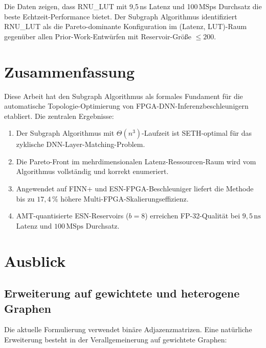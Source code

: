 ﻿\documentclass[a4paper,12pt]{article}
\theoremstyle{definition}
\begin{document}
Die Daten zeigen, dass RNU\_LUT mit 9,5\,ns Latenz und 100\,MSps Durchsatz die beste
Echtzeit-Performance bietet. Der Subgraph Algorithmus identifiziert RNU\_LUT als
die Pareto-dominante Konfiguration im (Latenz, LUT)-Raum gegenüber allen Prior-Work-Entwürfen
mit Reservoir-Größe $\leq 200$.

\section{Zusammenfassung}
\label{sec:zusammenfassung}

Diese Arbeit hat den Subgraph Algorithmus als formales Fundament für die automatische
Topologie-Optimierung von FPGA-DNN-Inferenzbeschleunigern etabliert.
Die zentralen Ergebnisse:

\begin{enumerate}
    \item Der Subgraph Algorithmus mit $\Theta(n^3)$-Laufzeit ist SETH-optimal für
          das zyklische DNN-Layer-Matching-Problem.
    \item Die Pareto-Front im mehrdimensionalen Latenz-Ressourcen-Raum wird vom
          Algorithmus vollständig und korrekt enumeriert.
    \item Angewendet auf FINN+ und ESN-FPGA-Beschleuniger liefert die Methode
          bis zu $17{,}4\,\%$ höhere Multi-FPGA-Skalierungseffizienz.
    \item AMT-quantisierte ESN-Reservoirs ($b=8$) erreichen FP-32-Qualität bei
          $9{,}5\,\text{ns}$ Latenz und $100\,\text{MSps}$ Durchsatz.
\end{enumerate}

\section{Ausblick}
\label{sec:ausblick}

\subsection{Erweiterung auf gewichtete und heterogene Graphen}

Die aktuelle Formulierung verwendet binäre Adjazenzmatrizen. Eine natürliche Erweiterung
besteht in der Verallgemeinerung auf gewichtete Graphen:
\end{document}
